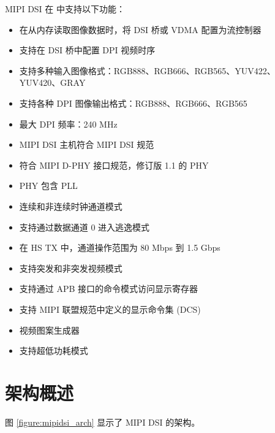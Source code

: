 \documentclass[main\_\_CN.tex]{subfiles}
\begin{document}
MIPI DSI 在 \chipname{} 中支持以下功能：
\begin{itemize}
    \item 在从内存读取图像数据时，将 DSI 桥或 VDMA 配置为流控制器
    \item 支持在 DSI 桥中配置 DPI 视频时序
    \item 支持多种输入图像格式：RGB888、RGB666、RGB565、YUV422、YUV420、GRAY
    \item 支持各种 DPI 图像输出格式：RGB888、RGB666、RGB565
    \item 最大 DPI 频率：240 MHz
    \item MIPI DSI 主机符合 MIPI DSI 规范
    \item 符合 MIPI D-PHY 接口规范，修订版 1.1 的 PHY
    \item PHY 包含 PLL
    \item 连续和非连续时钟通道模式
    \item 支持通过数据通道 0 进入逃逸模式
    \item 在 HS TX 中，通道操作范围为 80 Mbps 到 1.5 Gbps
    \item 支持突发和非突发视频模式
    \item 支持通过 APB 接口的命令模式访问显示寄存器
    \item 支持 MIPI 联盟规范中定义的显示命令集 (DCS)
    \item 视频图案生成器
    \item 支持超低功耗模式
\end{itemize}



\section{架构概述}
\label{sec:mipidsi-arch-overview}
图 \ref{figure:mipidsi_arch} 显示了 MIPI DSI 的架构。
\end{document}
